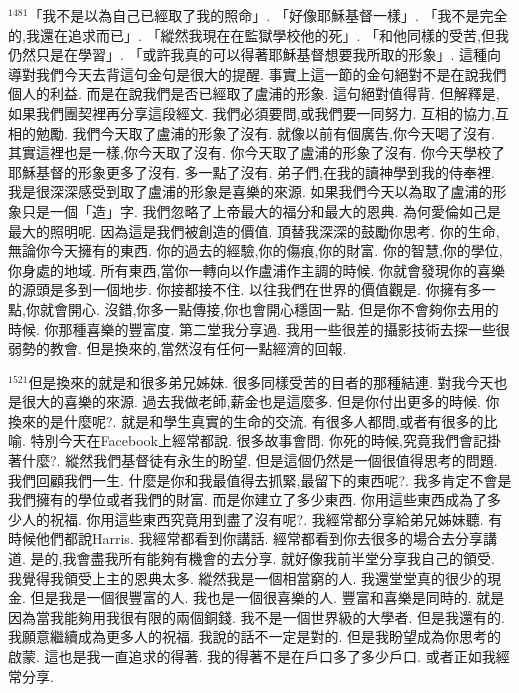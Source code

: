 \documentclass{book}
\begin{document}
$^{1481}$「我不是以為自己已經取了我的照命」.
「好像耶穌基督一樣」.
「我不是完全的,我還在追求而已」.
「縱然我現在在監獄學校他的死」.
「和他同樣的受苦,但我仍然只是在學習」.
「或許我真的可以得著耶穌基督想要我所取的形象」.
這種向導對我們今天去背這句金句是很大的提醒.
事實上這一節的金句絕對不是在說我們個人的利益.
而是在說我們是否已經取了盧浦的形象.
這句絕對值得背.
但解釋是,如果我們團契裡再分享這段經文.
我們必須要問,或我們要一同努力.
互相的協力,互相的勉勵.
我們今天取了盧浦的形象了沒有.
就像以前有個廣告,你今天喝了沒有.
其實這裡也是一樣,你今天取了沒有.
你今天取了盧浦的形象了沒有.
你今天學校了耶穌基督的形象更多了沒有.
多一點了沒有.
弟子們,在我的讀神學到我的侍奉裡.
我是很深深感受到取了盧浦的形象是喜樂的來源.
如果我們今天以為取了盧浦的形象只是一個「造」字.
我們忽略了上帝最大的福分和最大的恩典.
為何愛倫如己是最大的照明呢.
因為這是我們被創造的價值.
頂替我深深的鼓勵你思考.
你的生命,無論你今天擁有的東西.
你的過去的經驗,你的傷痕,你的財富.
你的智慧,你的學位,你身處的地域.
所有東西,當你一轉向以作盧浦作主調的時候.
你就會發現你的喜樂的源頭是多到一個地步.
你接都接不住.
以往我們在世界的價值觀是.
你擁有多一點,你就會開心.
沒錯,你多一點傳接,你也會開心穩固一點.
但是你不會夠你去用的時候.
你那種喜樂的豐富度.
第二堂我分享過.
我用一些很差的攝影技術去探一些很弱勢的教會.
但是換來的,當然沒有任何一點經濟的回報.

$^{1521}$但是換來的就是和很多弟兄姊妹.
很多同樣受苦的目者的那種結連.
對我今天也是很大的喜樂的來源.
過去我做老師,薪金也是這麼多.
但是你付出更多的時候.
你換來的是什麼呢?.
就是和學生真實的生命的交流.
有很多人都問,或者有很多的比喻.
特別今天在Facebook上經常都說.
很多故事會問.
你死的時候,究竟我們會記掛著什麼?.
縱然我們基督徒有永生的盼望.
但是這個仍然是一個很值得思考的問題.
我們回顧我們一生.
什麼是你和我最值得去抓緊,最留下的東西呢?.
我多肯定不會是我們擁有的學位或者我們的財富.
而是你建立了多少東西.
你用這些東西成為了多少人的祝福.
你用這些東西究竟用到盡了沒有呢?.
我經常都分享給弟兄姊妹聽.
有時候他們都說Harris.
我經常都看到你講話.
經常都看到你去很多的場合去分享講道.
是的,我會盡我所有能夠有機會的去分享.
就好像我前半堂分享我自己的領受.
我覺得我領受上主的恩典太多.
縱然我是一個相當窮的人.
我還堂堂真的很少的現金.
但是我是一個很豐富的人.
我也是一個很喜樂的人.
豐富和喜樂是同時的.
就是因為當我能夠用我很有限的兩個銅錢.
我不是一個世界級的大學者.
但是我還有的.
我願意繼續成為更多人的祝福.
我說的話不一定是對的.
但是我盼望成為你思考的啟蒙.
這也是我一直追求的得著.
我的得著不是在戶口多了多少戶口.
或者正如我經常分享.
\end{document}
